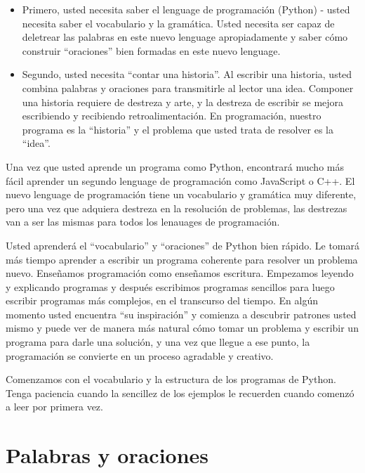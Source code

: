 \begin{itemize}

\item Primero, usted necesita saber el lenguage de programaci\'on (Python) -
usted necesita saber el vocabulario y la gram\'atica. Usted necesita ser capaz de deletrear las palabras en este nuevo lenguage apropiadamente y saber c\'omo construir ``oraciones'' bien formadas en este nuevo lenguage.

\item Segundo, usted necesita ``contar una historia''. Al escribir una historia,
usted combina palabras y oraciones para transmitirle al lector una idea. Componer una historia requiere de destreza y arte, y la destreza de escribir se mejora escribiendo y recibiendo retroalimentaci\'on. En programaci\'on, nuestro programa es la ``historia'' y el problema que usted trata de resolver es la ``idea''.

\end{itemize}

Una vez que usted aprende un programa como Python, encontrar\'a mucho m\'as f\'acil aprender un segundo lenguage de programaci\'on como JavaScript o C++. El nuevo lenguage de programaci\'on tiene un vocabulario y gram\'atica muy diferente, pero una vez que adquiera destreza en la resoluci\'on de problemas, las destrezas van a ser las mismas para todos los lenauages de programaci\'on.

Usted aprender\'a el ``vocabulario'' y ``oraciones'' de Python bien r\'apido.
Le tomar\'a m\'as tiempo aprender a escribir un programa coherente para resolver un problema nuevo. Ense\~namos programaci\'on como ense\~namos escritura. Empezamos leyendo y explicando programas y despu\'es escribimos programas sencillos para luego escribir programas m\'as complejos, en el transcurso del tiempo.
En alg\'un momento usted encuentra ``su inspiraci\'on'' y comienza a descubrir patrones usted mismo y puede ver de manera m\'as natural c\'omo tomar un problema y escribir un programa para darle una soluci\'on, y una vez que llegue a ese punto, la programaci\'on se convierte en un proceso agradable y creativo.  

Comenzamos con el vocabulario y la estructura de los programas de Python. Tenga paciencia cuando la sencillez de los ejemplos le recuerden cuando comenz\'o a leer por primera vez. 

\section{Palabras y oraciones}

